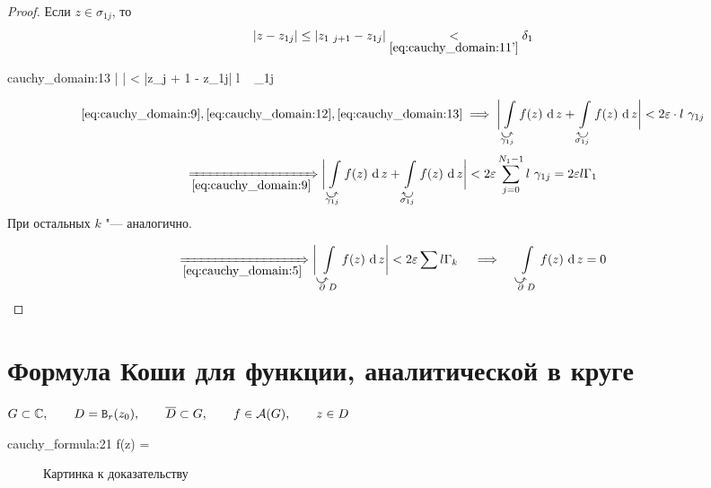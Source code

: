 \begin{proof}
	Если $ z \in \sigma_{1j} $, то
	$$ |z - z_{1j}| \le |z_{1~j + 1} - z_{1j}| \underset{\eref{cauchy_domain:11'}}< \delta_1 $$
	\begin{equ}{cauchy_domain:13}
		\implies \bigg|  \bigg| \le {} < \eps \cdot |z_{j + 1} - z_{1j}| \le \eps \cdot l ~ \gamma_{1j}
	\end{equ}

	$$ \eref{cauchy_domain:9}, \eref{cauchy_domain:12}, \eref{cauchy_domain:13} \implies \bigg| \cint[z]{\curvedir{\gamma_{1j}}}{f(z)} + \cint[z]{\curvedir[0]{\sigma_{1j}}}{f(z)} \bigg| < 2\eps \cdot l ~ \gamma_{1j} $$
	$$ \underimp{\eref{cauchy_domain:9}} \bigg| \cint[z]{\curvedir{\gamma_{1j}}}{f(z)} + \cint[z]{\curvedir[0]{\sigma_{1j}}}{f(z)} \bigg| < 2\eps \sum_{j = 0}^{N_1 - 1} l ~ \gamma_{1j} = 2 \eps l \Gamma_1 $$
	При остальных $ k $ "--- аналогично.

	$$ \underimp{\eref{cauchy_domain:5}} \bigg| \cint[z]{\curvedir\partial D}{f(z)} \bigg| < 2\eps \sum l \Gamma_k \quad
	\implies \quad \cint[z]{\curvedir\partial D}{f(z)} = 0 $$
\end{proof}

\section{Формула Коши для функции, аналитической в круге}

\begin{theorem}
	$ G \subset \mathbb{C}, \qquad D = \mathtt B_r(z_0), \qquad \overline D \subset G, \qquad f \in \mathcal A(G), \qquad z \in D $
	\begin{equ}{cauchy_formula:21}
		f(z) =  
	\end{equ}
\end{theorem}

\begin{figure}[!h]
	\caption{Картинка к доказательству}
\end{figure}

